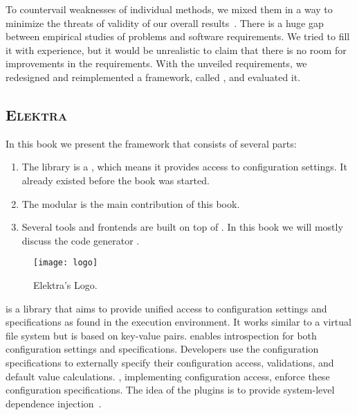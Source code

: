 To countervail weaknesses of individual methods, we mixed them in a way to minimize the threats of validity of our overall results~\cite{ihantola2011threats}.
There is a huge gap between empirical studies of problems and software requirements.
We tried to fill it with experience, but it would be unrealistic to claim that there is no room for improvements in the requirements.
With the unveiled requirements, we redesigned and reimplemented a framework, called \elektra{}, and evaluated it.


\subsection{\textsc{Elektra}}

In this book we present the framework \elektra{} that consists of several parts:

\begin{enumerate}
 \item The library  is a , which means it provides access to configuration settings.
 It already existed before the book was started.
 \item The modular   is the main contribution of this book.
 \item Several tools and frontends are built on top of .
       In this book we will mostly discuss the code generator .
\end{enumerate}

\begin{wrapfigure}{r}{0.5\textwidth}
\centering
\texttt{[image: logo]}
\caption{Elektra's Logo.}
\label{fig:logo}
\end{wrapfigure}

 is a library that aims to provide unified access to configuration settings and specifications as found in the execution environment.
It works similar to a virtual file system but is based on key-value pairs.
 enables introspection for both configuration settings and specifications.
Developers use the configuration specifications to externally specify their configuration access, validations, and default value calculations.
, implementing configuration access, enforce these configuration specifications.
The idea of the plugins is to provide system-level dependence injection~\cite{raab2017challenges}.



